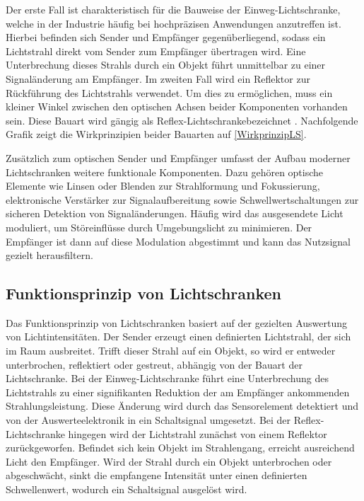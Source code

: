 Der erste Fall ist charakteristisch für die Bauweise der \glqq Einweg-Lichtschranke\grqq, welche in der Industrie häufig bei hochpräzisen Anwendungen anzutreffen ist. Hierbei befinden sich Sender und Empfänger gegenüberliegend, sodass ein Lichtstrahl direkt vom Sender zum Empfänger übertragen wird. Eine Unterbrechung dieses Strahls durch ein Objekt führt unmittelbar zu einer Signaländerung am Empfänger.
Im zweiten Fall wird ein Reflektor zur Rückführung des Lichtstrahls verwendet. Um dies zu ermöglichen, muss ein kleiner Winkel zwischen den optischen Achsen beider Komponenten vorhanden sein. Diese Bauart wird gängig als \glqq Reflex-Lichtschranke\grqq \space bezeichnet \cite{Loeffler-Mang:2012}. Nachfolgende Grafik zeigt die Wirkprinzipien beider Bauarten auf \ref{WirkprinzipLS}.

Zusätzlich zum optischen Sender und Empfänger umfasst der Aufbau moderner Lichtschranken weitere funktionale Komponenten. Dazu gehören optische Elemente wie Linsen oder Blenden zur Strahlformung und Fokussierung, elektronische Verstärker zur Signalaufbereitung sowie Schwellwertschaltungen zur sicheren Detektion von Signaländerungen. Häufig wird das ausgesendete Licht moduliert, um Störeinflüsse durch Umgebungslicht zu minimieren. Der Empfänger ist dann auf diese Modulation abgestimmt und kann das Nutzsignal gezielt herausfiltern. \cite{Loeffler-Mang:2012}

\subsection{Funktionsprinzip von Lichtschranken}
Das Funktionsprinzip von Lichtschranken basiert auf der gezielten Auswertung von Lichtintensitäten. 
Der Sender erzeugt einen definierten Lichtstrahl, der sich im Raum ausbreitet. Trifft dieser Strahl auf ein Objekt, so wird er entweder unterbrochen, reflektiert oder gestreut, abhängig von der Bauart der Lichtschranke.
Bei der Einweg-Lichtschranke führt eine Unterbrechung des Lichtstrahls zu einer signifikanten Reduktion der am Empfänger ankommenden Strahlungsleistung. Diese Änderung wird durch das Sensorelement detektiert und von der Auswerteelektronik in ein Schaltsignal umgesetzt. 
Bei der Reflex-Lichtschranke hingegen wird der Lichtstrahl zunächst von einem Reflektor zurückgeworfen. Befindet sich kein Objekt im Strahlengang, erreicht ausreichend Licht den Empfänger. Wird der Strahl durch ein Objekt unterbrochen oder abgeschwächt, sinkt die empfangene Intensität unter einen definierten Schwellenwert, wodurch ein Schaltsignal ausgelöst wird.


